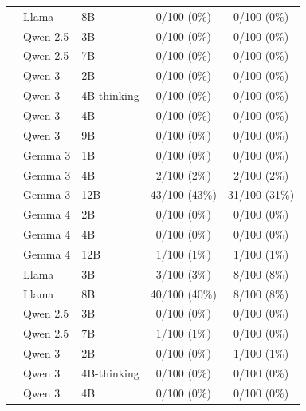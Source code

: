 \begin{table}[h]
\begin{tabular}{>{\raggedright\arraybackslash}p{2.2cm} l l c c}
                   & Llama             & 8B           & 0/100 (0\%)   & 0/100 (0\%)  \\
                   & Qwen 2.5          & 3B           & 0/100 (0\%)   & 0/100 (0\%)  \\
                   & Qwen 2.5          & 7B           & 0/100 (0\%)   & 0/100 (0\%)  \\
                   & Qwen 3            & 2B           & 0/100 (0\%)   & 0/100 (0\%)  \\
                   & Qwen 3            & 4B-thinking  & 0/100 (0\%)   & 0/100 (0\%)  \\
                   & Qwen 3            & 4B           & 0/100 (0\%)   & 0/100 (0\%)  \\
                   & Qwen 3            & 9B           & 0/100 (0\%)   & 0/100 (0\%)  \\
        \midrule
        \multirow{14}{2.2cm}{Animal Welfare Brief Experiment}
                   & Gemma 3           & 1B           & 0/100 (0\%)   & 0/100 (0\%)  \\
                   & Gemma 3           & 4B           & 2/100 (2\%)   & 2/100 (2\%)  \\
                   & Gemma 3           & 12B          & 43/100 (43\%) & 31/100 (31\%) \\
                   & Gemma 4           & 2B           & 0/100 (0\%)   & 0/100 (0\%)  \\
                   & Gemma 4           & 4B           & 0/100 (0\%)   & 0/100 (0\%)  \\
                   & Gemma 4           & 12B          & 1/100 (1\%)   & 1/100 (1\%)  \\
                   & Llama             & 3B           & 3/100 (3\%)   & 8/100 (8\%)  \\
                   & Llama             & 8B           & 40/100 (40\%) & 8/100 (8\%)  \\
                   & Qwen 2.5          & 3B           & 0/100 (0\%)   & 0/100 (0\%)  \\
                   & Qwen 2.5          & 7B           & 1/100 (1\%)   & 0/100 (0\%)  \\
                   & Qwen 3            & 2B           & 0/100 (0\%)   & 1/100 (1\%)  \\
                   & Qwen 3            & 4B-thinking  & 0/100 (0\%)   & 0/100 (0\%)  \\
                   & Qwen 3            & 4B           & 0/100 (0\%)   & 0/100 (0\%)  \\

\end{tabular}
\end{table}
